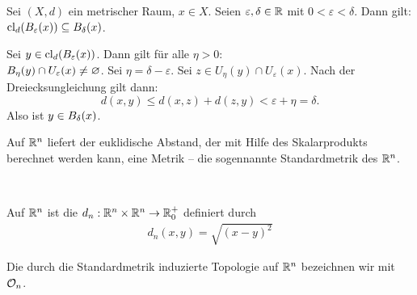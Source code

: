 



    \begin{satz}\label{satz:ball}
    Sei $(X,d)$ ein metrischer Raum, $x \in X$. Seien $\varepsilon, \delta \in \mathbb{R}$ mit $0 < \varepsilon< \delta$. Dann gilt: $\text{cl}_d(B_\varepsilon(x)) \subseteq B_\delta(x)$.
    \end{satz}
    \begin{bew}
    Sei $y \in \text{cl}_d(B_\varepsilon(x))$. Dann gilt für alle $\eta > 0$:\\ $B_\eta(y) \cap U_\varepsilon(x) \neq \varnothing$. Sei $\eta = \delta - \varepsilon$. Sei $z \in U_\eta(y) \cap U_\varepsilon(x)$. Nach der Dreiecksungleichung gilt dann:
    $$d(x,y) \leq d(x,z) + d(z,y) < \varepsilon + \eta = \delta.$$
    Also ist $y \in B_\delta(x)$.
    \end{bew}


    Auf
    $\mathbb{R}^n$ liefert der euklidische Abstand, der mit Hilfe des Skalarprodukts berechnet werden kann, eine Metrik -- die sogennannte Standardmetrik des $\mathbb{R}^n$.
    \begin{dfn}\label{def:standardmetrik}\ \vspace{8pt}

        \noindent
        Auf $\mathbb{R}^n$ ist die  $d_n : \mathbb{R}^n \times \mathbb{R}^n \rightarrow \mathbb{R}_0^+$ definiert durch
        \begin{align*}
            d_n(x,y) = \sqrt{(x-y)^2}
        \end{align*}
        
        \noindent
        Die durch die Standardmetrik induzierte Topologie auf $\mathbb{R}^n$ bezeichnen wir mit $\mathcal{O}_n$.
        
    \end{dfn}

